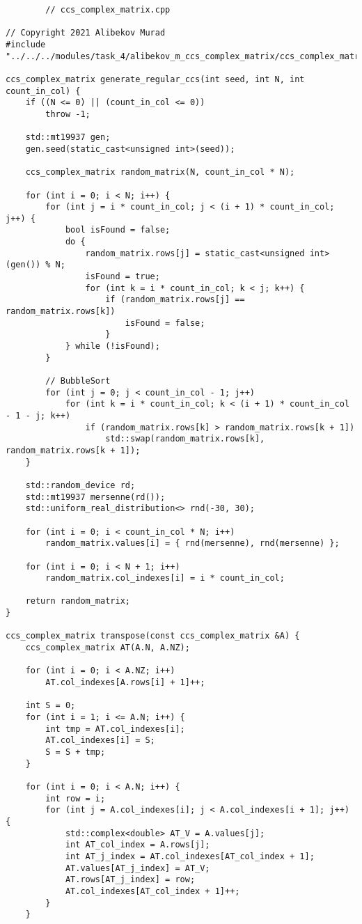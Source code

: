 \documentclass{report}
\begin{document}
	\begin{lstlisting}
		// ccs_complex_matrix.cpp

// Copyright 2021 Alibekov Murad
#include "../../../modules/task_4/alibekov_m_ccs_complex_matrix/ccs_complex_matrix.h"

ccs_complex_matrix generate_regular_ccs(int seed, int N, int count_in_col) {
    if ((N <= 0) || (count_in_col <= 0))
        throw -1;

    std::mt19937 gen;
    gen.seed(static_cast<unsigned int>(seed));

    ccs_complex_matrix random_matrix(N, count_in_col * N);

    for (int i = 0; i < N; i++) {
        for (int j = i * count_in_col; j < (i + 1) * count_in_col; j++) {
            bool isFound = false;
            do {
                random_matrix.rows[j] = static_cast<unsigned int>(gen()) % N;
                isFound = true;
                for (int k = i * count_in_col; k < j; k++) {
                    if (random_matrix.rows[j] == random_matrix.rows[k])
                        isFound = false;
                    }
            } while (!isFound);
        }

        // BubbleSort
        for (int j = 0; j < count_in_col - 1; j++)
            for (int k = i * count_in_col; k < (i + 1) * count_in_col - 1 - j; k++)
                if (random_matrix.rows[k] > random_matrix.rows[k + 1])
                    std::swap(random_matrix.rows[k], random_matrix.rows[k + 1]);
    }

    std::random_device rd;
    std::mt19937 mersenne(rd());
    std::uniform_real_distribution<> rnd(-30, 30);

    for (int i = 0; i < count_in_col * N; i++)
        random_matrix.values[i] = { rnd(mersenne), rnd(mersenne) };

    for (int i = 0; i < N + 1; i++)
        random_matrix.col_indexes[i] = i * count_in_col;

    return random_matrix;
}

ccs_complex_matrix transpose(const ccs_complex_matrix &A) {
    ccs_complex_matrix AT(A.N, A.NZ);

    for (int i = 0; i < A.NZ; i++)
        AT.col_indexes[A.rows[i] + 1]++;

    int S = 0;
    for (int i = 1; i <= A.N; i++) {
        int tmp = AT.col_indexes[i];
        AT.col_indexes[i] = S;
        S = S + tmp;
    }

    for (int i = 0; i < A.N; i++) {
        int row = i;
        for (int j = A.col_indexes[i]; j < A.col_indexes[i + 1]; j++) {
            std::complex<double> AT_V = A.values[j];
            int AT_col_index = A.rows[j];
            int AT_j_index = AT.col_indexes[AT_col_index + 1];
            AT.values[AT_j_index] = AT_V;
            AT.rows[AT_j_index] = row;
            AT.col_indexes[AT_col_index + 1]++;
        }
    }


\end{lstlisting}
\end{document}
